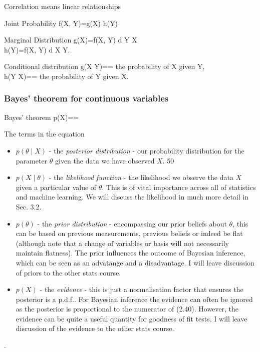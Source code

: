 \documentclass[12pt,a4paper]{article}
\begin{document}
Correlation means linear relationships\\
\begin{definition}
    {Joint Probability}
    {f(X, Y)=g(X) h(Y)}
    {}
\end{definition}
\begin{definition}
    {Marginal Distribution}
    {g(X)=\int f(X, Y) d Y X\\ 
     h(Y)=\int f(X, Y) d X Y.}
    {}
\end{definition}
\begin{definition}
    {Conditional distribution}
    {g(X \mid Y)== the probability of X given Y,\\
    h(Y \mid X)== the probability of Y given X.}
    {}
\end{definition}
\subsubsection{Bayes' theorem for continuous variables}
\begin{definition}
    {Bayes' theorem}
    {p(\theta \mid X)==}
    {The terms in the equation
    \begin{itemize}
        \item $p(\theta \mid X)$ - the \textit{posterior distribution} - our probability distribution for the parameter $\theta$ given the data we have observed $X$.
        50
        \item $p(X \mid \theta)$ - the \textit{likelihood function} - the likelihood we observe the data $X$ given a particular value of $\theta$. This is of vital importance across all of statistics and machine learning. We will discuss the likelihood in much more detail in Sec. 3.2.
        \item $p(\theta)$ - the \textit{prior distribution} - encompassing our prior beliefs about $\theta$, this can be based on previous measurements, previous beliefs or indeed be flat (although note that a change of variables or basis will not necessarily maintain flatness). The prior influences the outcome of Bayesian inference, which can be seen as an advatange and a disadvantage. I will leave discussion of priors to the other stats course.
        \item $p(X)$ - the \textit{evidence} - this is just a normalisation factor that ensures the posterior is a p.d.f.. For Bayesian inference the evidence can often be ignored as the posterior is proportional to the numerator of (2.40). However, the evidence can be quite a useful quantity for goodness of fit tests. I will leave discussion of the evidence to the other stats course.
    \end{itemize}.
    }
\end{definition}
\end{document}
